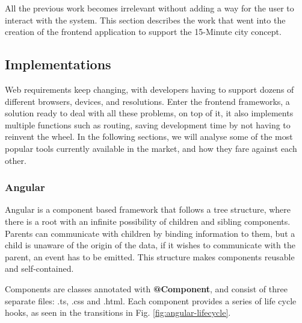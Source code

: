  
All the previous work becomes irrelevant without adding a way for the user to interact with the system. This section describes the work that went into the creation of the frontend application to support the 15-Minute city concept.

\subsection{Implementations}
\label{ss:ui-implementations}

Web requirements keep changing, with developers having to support dozens of different browsers, devices, and resolutions. Enter the frontend frameworks, a solution ready to deal with all these problems, on top of it, it also implements multiple functions such as routing, saving development time by not having to reinvent the wheel. In the following sections, we will analyse some of the most popular tools currently available in the market, and how they fare against each other.

\subsubsection{Angular}
\label{sss:angular}

Angular is a component based framework that follows a tree structure, where there is a root with an infinite possibility of children and sibling components. Parents can communicate with children by binding information to them, but a child is unaware of the origin of the data, if it wishes to communicate with the parent, an event has to be emitted. This structure makes components reusable and self-contained.

Components are classes annotated with \textbf{@Component}, and consist of three separate files: .ts, .css and .html. Each component provides a series of life cycle hooks, as seen in the transitions in Fig. \ref{fig:angular-lifecycle}.


